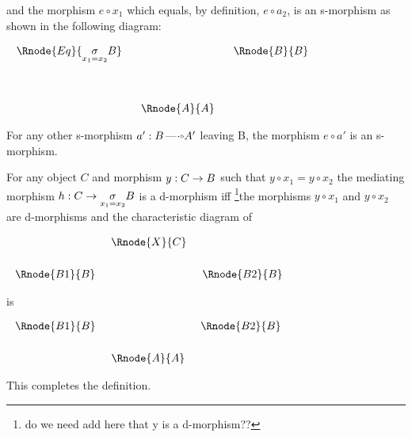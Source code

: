 \documentclass[10pt,a4paper]{scrartcl}
\begin{document}
\begin{enumerate} [A.,leftmargin=0.5cm]
\noindent and the morphism $e \circ x_1$ which equals, by definition, $e \circ a_2$,  is an s-morphism as shown
in the following diagram:
\vspace{.2cm}
\begin{center}

$
\setlength{\arraycolsep}{.3cm}
\begin{array}{ccc}
\Rnode{Eq}{\underset{x_1=x_2}{\sigma}B} & &\Rnode{B}{B} \\[1.4cm]
 & \Rnode{A}{A} &\\
\end{array}
$
\end{center}

\noindent For any other s-morphism $a':B\dmorph A'$ leaving B, the morphism $e \circ a'$ is an s-morphism.

\noindent For any object $C$ and morphism $y: C \rightarrow B$ such that
$y \circ x_1 = y \circ x_2$
the mediating morphism $h: C \rightarrow \underset{x_1=x_2}{\sigma}B$ is a d-morphism iff 
\footnote{do we need add here that y is a d-morphism??}the morphisms $y \circ x_1$ and $y \circ x_2$ are d-morphisms and the characteristic diagram
of

\begin{center}
$
\setlength{\arraycolsep}{.25cm}
\begin{array}{ccc}
             & \Rnode{X}{C}&               \\ [0.6cm]
\Rnode{B1}{B}&             & \Rnode{B2}{B} \\ 
\end{array}
$
\end{center}

is
\begin{center}
$
\setlength{\arraycolsep}{.25cm}
\begin{array}{ccc}
\Rnode{B1}{B}&            & \Rnode{B2}{B} \\ [0.6cm]
             &\Rnode{A}{A}& 
\end{array}
$
\end{center}


\noindent This completes the definition.

\end{enumerate}
\end{document}
